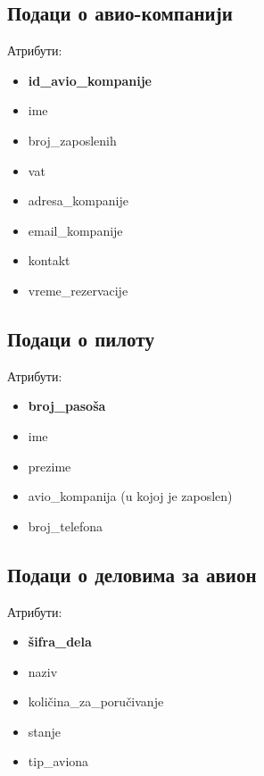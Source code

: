 \documentclass{article}
\begin{document}
\subsection{Подаци о авио-компанији}

\vspace{10}
Атрибути:
\begin{itemize}
    \item \textbf{id\_avio\_kompanije}
    \item ime
    \item broj\_zaposlenih
    \item vat
    \item adresa\_kompanije
    \item email\_kompanije
    \item kontakt
    \item vreme\_rezervacije
\end{itemize}

\subsection{Подаци о пилоту}

\vspace{10}
Атрибути:
\begin{itemize}
    \item \textbf{broj\_pasoša}
    \item ime
    \item prezime
    \item avio\_kompanija (u kojoj je zaposlen)
    \item broj\_telefona
\end{itemize}


\subsection{Подаци о деловима за авион}

\vspace{10}
Атрибути:
\begin{itemize}
    \item \textbf{šifra\_dela}
    \item naziv
    \item količina\_za\_poručivanje
    \item stanje
    \item tip\_aviona
\end{itemize}
\end{document}
